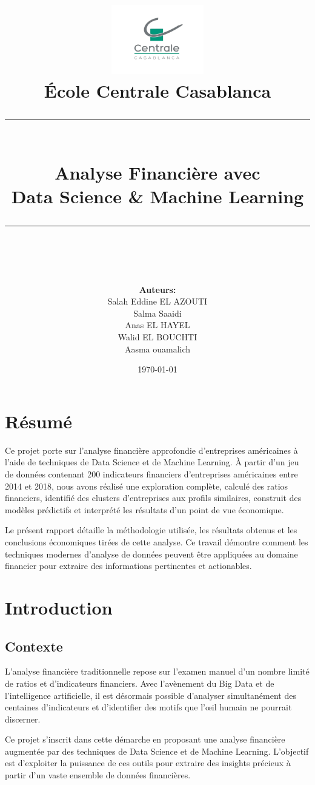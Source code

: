 \documentclass[11pt]{report}
\title{
    \vspace{-2cm}
    \includegraphics[width=0.3\textwidth]{figures/logo-ecc.png}\\[1cm]
    \LARGE{École Centrale Casablanca}\\[0.5cm]
    \rule{\linewidth}{0.5mm}\\[0.4cm]
    \huge{\textbf{Analyse Financière avec\\Data Science \& Machine Learning}}\\
    \rule{\linewidth}{0.5mm}\\[1.5cm]
}
\author{
    \large
    \textbf{Auteurs:}\\
    Salah Eddine EL AZOUTI\\
    Salma Saaidi\\
    Anas EL HAYEL\\
    Walid EL BOUCHTI\\
    Aasma ouamalich
}
\date{\today}
\begin{document}
\maketitle
\thispagestyle{empty}

\newpage
\tableofcontents
\thispagestyle{empty}

\newpage
\chapter*{Résumé}
Ce projet porte sur l'analyse financière approfondie d'entreprises américaines à l'aide de techniques de Data Science et de Machine Learning. À partir d'un jeu de données contenant 200 indicateurs financiers d'entreprises américaines entre 2014 et 2018, nous avons réalisé une exploration complète, calculé des ratios financiers, identifié des clusters d'entreprises aux profils similaires, construit des modèles prédictifs et interprété les résultats d'un point de vue économique.

Le présent rapport détaille la méthodologie utilisée, les résultats obtenus et les conclusions économiques tirées de cette analyse. Ce travail démontre comment les techniques modernes d'analyse de données peuvent être appliquées au domaine financier pour extraire des informations pertinentes et actionables.

\chapter{Introduction}
\section{Contexte}
L'analyse financière traditionnelle repose sur l'examen manuel d'un nombre limité de ratios et d'indicateurs financiers. Avec l'avènement du Big Data et de l'intelligence artificielle, il est désormais possible d'analyser simultanément des centaines d'indicateurs et d'identifier des motifs que l'œil humain ne pourrait discerner. 

Ce projet s'inscrit dans cette démarche en proposant une analyse financière augmentée par des techniques de Data Science et de Machine Learning. L'objectif est d'exploiter la puissance de ces outils pour extraire des insights précieux à partir d'un vaste ensemble de données financières.
\end{document}
